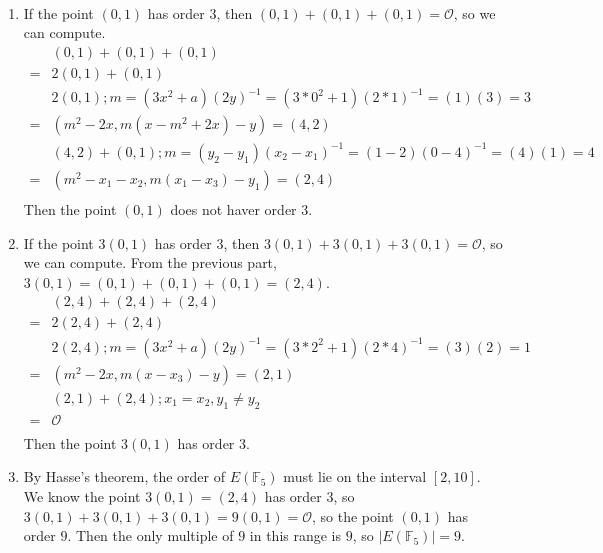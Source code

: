 \documentclass{assignment}
\begin{document}
\begin{problemlist}
\pbitem
\begin{problem}
\end{problem}
\begin{answer}
  \\
  \begin{enumerate}
  \item
    If the point $(0,1)$ has order $3$, then $(0,1)+(0,1)+(0,1)=\mathcal{O}$, so we can compute.\\
    \begin{align*}
      &(0,1)+(0,1)+(0,1)\\
      =&2(0,1)+(0,1)\\
      &2(0,1);m=(3x^2+a)(2y)^{-1}=(3*0^2+1)(2*1)^{-1}=(1)(3)=3\\
      =&(m^2-2x,m(x-m^2+2x)-y)=(4,2)\\
      &(4,2)+(0,1);m=(y_2-y_1)(x_2-x_1)^{-1}=(1-2)(0-4)^{-1}=(4)(1)=4\\
      =&(m^2-x_1-x_2,m(x_1-x_3)-y_1)=(2,4)\\
    \end{align*}
    Then the point $(0,1)$ does not haver order $3$.\\
  \item
    If the point $3(0,1)$ has order $3$, then $3(0,1)+3(0,1)+3(0,1)=\mathcal{O}$, so we can compute. From the previous part, $3(0,1)=(0,1)+(0,1)+(0,1)=(2,4)$.\\
    \begin{align*}
      &(2,4)+(2,4)+(2,4)\\
      =&2(2,4)+(2,4)\\
      &2(2,4);m=(3x^2+a)(2y)^{-1}=(3*2^2+1)(2*4)^{-1}=(3)(2)=1\\
      =&(m^2-2x,m(x-x_3)-y)=(2,1)\\
      &(2,1)+(2,4);x_1=x_2, y_1\neq y_2\\
      =&\mathcal{O}\\
    \end{align*}
    Then the point $3(0,1)$ has order $3$.\\
  \item
    By Hasse's theorem, the order of $E(\mathbb{F}_5)$ must lie on the interval $[2,10]$. We know the point $3(0,1)=(2,4)$ has order $3$, so $3(0,1)+3(0,1)+3(0,1)=9(0,1)=\mathcal{O}$, so the point $(0,1)$ has order $9$. Then the only multiple of $9$ in this range is $9$, so $|E(\mathbb{F}_5)|=9$.
  \end{enumerate}
\end{answer}


\end{problemlist}
\end{document}
